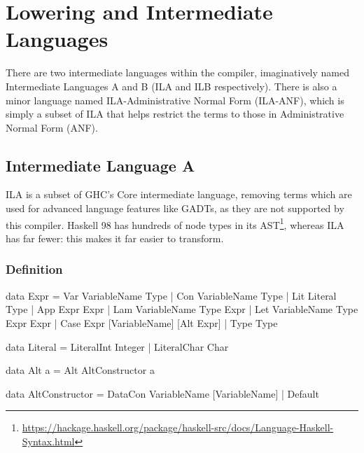 \documentclass[dissertation.tex]{subfiles}
\begin{document}
\section{Lowering and Intermediate Languages}
{

    There are two intermediate languages within the compiler, imaginatively named Intermediate Languages A and B
    (ILA and ILB respectively). There is also a minor language named ILA-Administrative Normal Form (ILA-ANF), which
    is simply a subset of ILA that helps restrict the terms to those in Administrative Normal Form (ANF).


    \subsection{Intermediate Language A}
    {

        ILA is a subset of GHC's Core intermediate language, removing terms which are used for advanced language
        features like GADTs, as they are not supported by this compiler. Haskell 98 has hundreds of node types in
        its
        AST\footnote{\url{https://hackage.haskell.org/package/haskell-src/docs/Language-Haskell-Syntax.html}}, whereas ILA has far fewer: this makes it far easier to transform.

        \subsubsection{Definition}
        {

            \begin{haskellfigure}
            data Expr = Var VariableName Type
                        | Con VariableName Type
                        | Lit Literal Type
                        | App Expr Expr
                        | Lam VariableName Type Expr
                        | Let VariableName Type Expr Expr
                        | Case Expr [VariableName] [Alt Expr]
                        | Type Type

            data Literal = LiteralInt Integer
                            | LiteralChar Char

            data Alt a = Alt AltConstructor a

            data AltConstructor = DataCon VariableName [VariableName]
                                | Default


\end{haskellfigure}}}}
\end{document}
